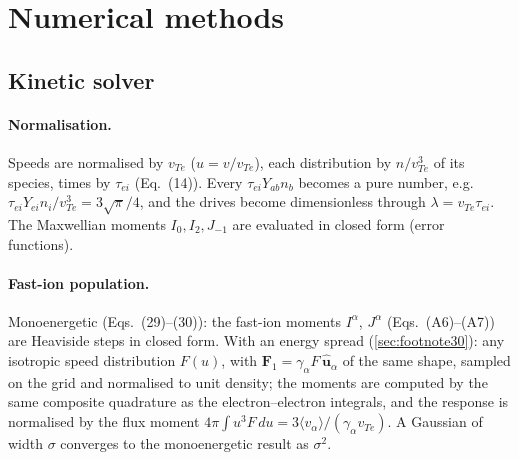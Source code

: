 \documentclass[11pt,a4paper]{article}
\begin{document}
\section{Numerical methods}\label{sec:methods}
\subsection{Kinetic solver}
\paragraph{Normalisation.} Speeds are normalised by $v_{Te}$ ($u=v/v_{Te}$), each distribution by $n/v_{Te}^3$ of its
species, times by $\tau_{ei}$ (Eq.~(14)). Every $\tau_{ei}Y_{ab}n_b$ becomes a pure number, e.g.\
$\tau_{ei}Y_{ei}n_i/v_{Te}^3=3\sqrt\pi/4$, and the drives become dimensionless through $\lambda=v_{Te}\tau_{ei}$. The
Maxwellian moments $I_0,I_2,J_{-1}$ are evaluated in closed form (error functions).

\paragraph{Fast-ion population.} Monoenergetic (Eqs.~(29)--(30)): the fast-ion moments $I^\alpha$, $J^\alpha$
(Eqs.~(A6)--(A7)) are Heaviside steps in closed form. With an energy spread (\cref{sec:footnote30}): any isotropic speed
distribution $F(u)$, with $\mathbf F_1=\gamma_\alpha F\,\hat{\mathbf u}_\alpha$ of the same shape, sampled on the grid and
normalised to unit density; the moments are computed by the same composite quadrature as the electron--electron
integrals, and the response is normalised by the flux moment $4\pi\!\int u^3F\,du=3\langle v_\alpha\rangle/(\gamma_\alpha
v_{Te})$. A Gaussian of width $\sigma$ converges to the monoenergetic result as $\sigma^2$.
\end{document}
